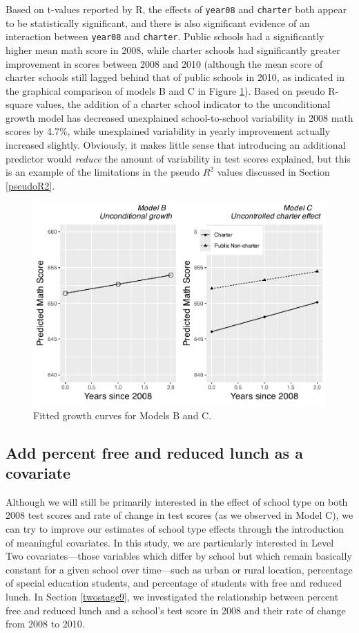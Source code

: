 \documentclass[
]{krantz}
\begin{document}
Based on t-values reported by R, the effects of \texttt{year08} and \texttt{charter} both appear to be statistically significant, and there is also significant evidence of an interaction between \texttt{year08} and \texttt{charter}. Public schools had a significantly higher mean math score in 2008, while charter schools had significantly greater improvement in scores between 2008 and 2010 (although the mean score of charter schools still lagged behind that of public schools in 2010, as indicated in the graphical comparison of models B and C in Figure \ref{fig:lon-scat4}). Based on pseudo R-square values, the addition of a charter school indicator to the unconditional growth model has decreased unexplained school-to-school variability in 2008 math scores by 4.7\%, while unexplained variability in yearly improvement actually increased slightly. Obviously, it makes little sense that introducing an additional predictor would \emph{reduce} the amount of variability in test scores explained, but this is an example of the limitations in the pseudo \(R^2\) values discussed in Section \ref{pseudoR2}.

\begin{figure}

{\centering \includegraphics[width=0.6\linewidth]{bookdown-BeyondMLR_files/figure-latex/lon-scat4-1} 

}

\caption{ Fitted growth curves for Models B and C.}\label{fig:lon-scat4}
\end{figure}

\hypertarget{modeld}{%
\subsection{Add percent free and reduced lunch as a covariate}\label{modeld}}

Although we will still be primarily interested in the effect of school type on both 2008 test scores and rate of change in test scores (as we observed in Model C), we can try to improve our estimates of school type effects through the introduction of meaningful covariates. In this study, we are particularly interested in Level Two covariates---those variables which differ by school but which remain basically constant for a given school over time---such as urban or rural location, percentage of special education students, and percentage of students with free and reduced lunch. In Section \ref{twostage9}, we investigated the relationship between percent free and reduced lunch and a school's test score in 2008 and their rate of change from 2008 to 2010.
\end{document}
